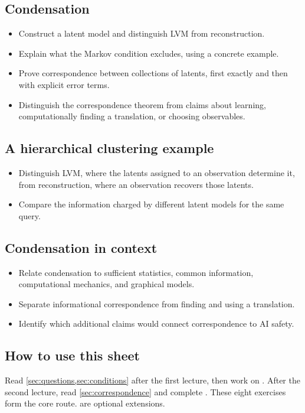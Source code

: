 \documentclass[11pt]{article}
\begin{document}
\begin{learningoutcomes}
\subsection*{Condensation}
\begin{itemize}
\item Construct a latent model and distinguish LVM from reconstruction.
\item Explain what the Markov condition excludes, using a concrete example.
\item Prove correspondence between collections of latents, first exactly and
then with explicit error terms.
\item Distinguish the correspondence theorem from claims about learning,
computationally finding a translation, or choosing observables.
\end{itemize}
\subsection*{A hierarchical clustering example}
\begin{itemize}
\item Distinguish LVM, where the latents assigned to an observation determine
it, from reconstruction, where an observation recovers those latents.
\item Compare the information charged by different latent models for the same query.
\end{itemize}
\subsection*{Condensation in context}
\begin{itemize}
\item Relate condensation to sufficient statistics, common information,
computational mechanics, and graphical models.
\item Separate informational correspondence from finding and using a translation.
\item Identify which additional claims would connect correspondence to AI safety.
\end{itemize}
\end{learningoutcomes}

\subsection*{How to use this sheet}
Read \cref{sec:questions,sec:conditions} after the first lecture, then work on
. After the second lecture, read
\cref{sec:correspondence} and complete . These eight exercises form the
core route.  are optional extensions.
\end{document}
